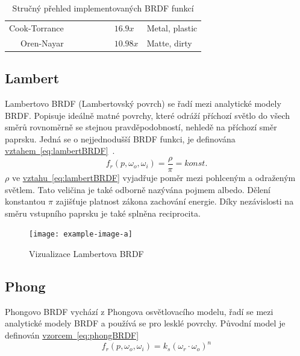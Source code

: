 \documentclass[czech,master]{diploma}
\newcommand{\point}{p}
\newcommand{\brdf}{f_r\left(\point,\omega_{o},\omega_{i}\right)}
\newcommand{\outVec}{\omega_{o}}
\newcommand{\refl}{\omega_{r}}
\newcommand{\alb}{\rho}
\newcommand{\true}{\ding{51}}
\newcommand{\false}{\ding{55}}
\begin{document}
\begin{table}[ht]
\begin{tabular}{r|lllllll}
    Cook-Torrance        & \true                    & \true                     & \true                       & \false                      & \false                   & \(16.9x\)                           & Metal, plastic                \\
    Oren-Nayar           & \true                    & \true                     & \false                      & \false                      & \true                    & \(10.98x\)                          & Matte, dirty                  \\
    \hline
  \end{tabular}
  \caption{Stručný přehled implementovaných BRDF funkcí}
  \label{tab:brdfProperties}
\end{table}

\subsection{Lambert} \label{sec:Lambert}
Lambertovo BRDF (Lambertovský povrch) se řadí mezi analytické modely BRDF\@. Popisuje ideálně matné povrchy, které odráží příchozí světlo do všech směrů rovnoměrně se stejnou pravděpodobností, nehledě na příchozí směr paprsku. Jedná se o nejjednodušší BRDF funkci, je definována \hyperref[eq:lambertBRDF]{vztahem~\ref{eq:lambertBRDF}}~\cite{Koppal2014}.
\begin{equation} \label{eq:lambertBRDF}
  \brdf = \frac{\alb}{\pi} = konst.
\end{equation}
\(\alb\) ve \hyperref[eq:lambertBRDF]{vztahu~\ref{eq:lambertBRDF}} vyjadřuje poměr mezi pohlceným a odraženým světlem. Tato veličina je také odborně nazývána pojmem albedo. Dělení konstantou \(\pi\) zajišťuje platnost zákona zachování energie. Díky nezávislosti na směru vstupního paprsku je také splněna reciprocita.

\begin{figure}[ht]%
  \centering\texttt{[image: example-image-a]}%
  \caption{Vizualizace Lambertova BRDF}%
  \label{fig:lambertBRDFRender}%
\end{figure}

\subsection{Phong} \label{sec:Phong}
Phongovo BRDF vychází z Phongova osvětlovacího modelu, řadí se mezi analytické modely BRDF a používá se pro lesklé povrchy. Původní model je definován \hyperref[eq:phongBRDF]{vzorcem~\ref{eq:phongBRDF}}~\cite{Phong1975}
\begin{equation} \label{eq:phongBRDF}
  \brdf = k_s{(\refl\cdot\outVec)}^{n}
\end{equation}
\end{document}
